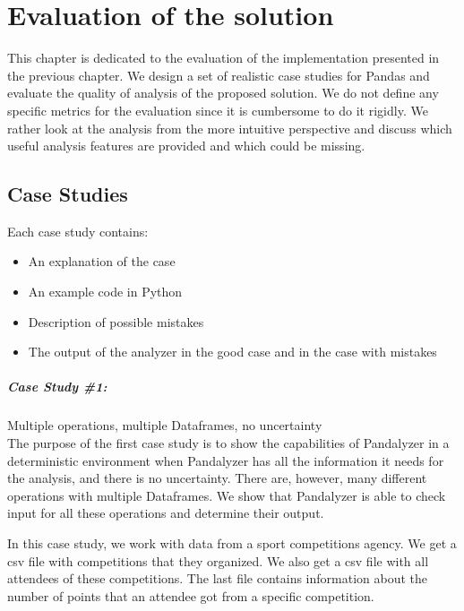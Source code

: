 \chapter{Evaluation of the solution}\label{ch:evaluation-of-solution}

This chapter is dedicated to the evaluation of the implementation presented in the previous chapter.
We design a set of realistic case studies for Pandas and evaluate the quality of analysis of the proposed solution.
We do not define any specific metrics for the evaluation since it is cumbersome to do it rigidly.
We rather look at the analysis from the more intuitive perspective and discuss which useful analysis features are
provided and which could be missing.

\section{Case Studies}

Each case study contains:
\begin{itemize}
    \item An explanation of the case
    \item An example code in Python
    \item Description of possible mistakes
    \item The output of the analyzer in the good case and in the case with mistakes
\end{itemize}

\paragraph{Case Study \#1:} Multiple operations, multiple Dataframes, no uncertainty  \\

The purpose of the first case study is to show the capabilities of Pandalyzer in a deterministic environment when
Pandalyzer has all the information it needs for the analysis, and there is no uncertainty.
There are, however, many different operations with multiple Dataframes.
We show that Pandalyzer is able to check input for all these operations and determine their output.

In this case study, we work with data from a sport competitions agency.
We get a csv file with competitions that they organized.
We also get a csv file with all attendees of these competitions.
The last file contains information about the number of points that an attendee got from a specific competition.

